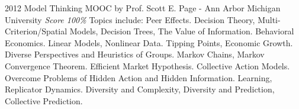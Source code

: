 \documentclass[11pt,a4paper]{moderncv}
\begin{document}
\cventry
    {2012}
    {Model Thinking}
    {MOOC by Prof. Scott E. Page - Ann Arbor}
    {Michigan University}
    {
        \textit{Score 100\%} %
    }
    {
        Topics include:                                                          %
            Peer Effects.                                                        %
            Decision Theory,                                                     %
            Multi-Criterion/Spatial Models,                                      %
            Decision Trees,                                                      %
            The Value of Information.                                            %
            Behavioral Economics.                                                %
            Linear Models,                                                       %
            Nonlinear Data.                                                      %
            Tipping Points,                                                      %
            Economic Growth.                                                     %
            Diverse Perspectives and Heuristics of Groups.                       %
            Markov Chains,                                                       %
            Markov Convergence Theorem.                                          %
            Efficient Market Hypothesis.                                         %
            Collective Action Models.                                            %
            Overcome Problems of Hidden Action and Hidden Information.           %
            Learning,                                                            %
            Replicator Dynamics.                                                 %
            Diversity and Complexity,                                            %
            Diversity and Prediction,                                            %
       Collective Prediction.                                                    %
    }

\end{document}
